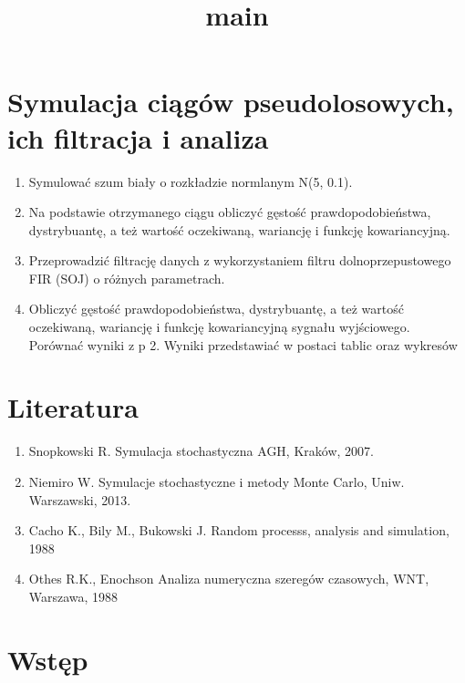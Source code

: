 \documentclass[11pt]{article}
\title{main}
\providecommand{\tightlist}{%
      \setlength{\itemsep}{0pt}\setlength{\parskip}{0pt}}
\begin{document}
    
    \maketitle
    
    

    
    \hypertarget{symulacja-ciux105guxf3w-pseudolosowych-ich-filtracja-i-analiza}{%
\section{Symulacja ciągów pseudolosowych, ich filtracja i
analiza}\label{symulacja-ciux105guxf3w-pseudolosowych-ich-filtracja-i-analiza}}

\begin{enumerate}
\def\labelenumi{\arabic{enumi}.}
\tightlist
\item
  Symulować szum biały o rozkładzie normlanym N(5, 0.1).
\item
  Na podstawie otrzymanego ciągu obliczyć gęstość prawdopodobieństwa,
  dystrybuantę, a też wartość oczekiwaną, wariancję i funkcję
  kowariancyjną.
\item
  Przeprowadzić filtrację danych z wykorzystaniem filtru
  dolnoprzepustowego FIR (SOJ) o różnych parametrach.
\item
  Obliczyć gęstość prawdopodobieństwa, dystrybuantę, a też wartość
  oczekiwaną, wariancję i funkcję kowariancyjną sygnału wyjściowego.
  Porównać wyniki z p 2. Wyniki przedstawiać w postaci tablic oraz
  wykresów
\end{enumerate}

    \hypertarget{literatura}{%
\section{Literatura}\label{literatura}}

\begin{enumerate}
\def\labelenumi{\arabic{enumi}.}
\tightlist
\item
  Snopkowski R. Symulacja stochastyczna AGH, Kraków, 2007.
\item
  Niemiro W. Symulacje stochastyczne i metody Monte Carlo, Uniw.
  Warszawski, 2013.
\item
  Cacho K., Bily M., Bukowski J. Random processs, analysis and
  simulation, 1988
\item
  Othes R.K., Enochson Analiza numeryczna szeregów czasowych, WNT,
  Warszawa, 1988
\end{enumerate}

    \hypertarget{wstux119p}{%
\section{Wstęp}\label{wstux119p}}
\end{document}
